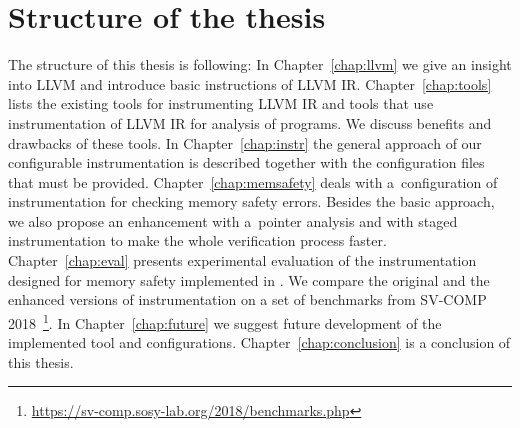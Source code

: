 \section{Structure of the thesis}

The structure of this thesis is following: In Chapter~\ref{chap:llvm} we give
an insight into LLVM and introduce basic instructions of LLVM IR.
Chapter~\ref{chap:tools} lists the existing tools for instrumenting LLVM IR and
tools that use instrumentation of LLVM IR for analysis of programs. We discuss
benefits and drawbacks of these tools. In Chapter~\ref{chap:instr} the general
approach of our configurable instrumentation is described together with the
configuration files that must be provided. Chapter~\ref{chap:memsafety} deals
with a~configuration of instrumentation for checking memory safety errors.
Besides the basic approach, we also propose an enhancement with a~pointer
analysis and with staged instrumentation to make the whole verification process
faster. Chapter~\ref{chap:eval} presents experimental evaluation of the
instrumentation designed for memory safety implemented in \symbiotic. We
compare the original and the enhanced versions of instrumentation on a set of
benchmarks from SV-COMP
2018~\footnote{\url{https://sv-comp.sosy-lab.org/2018/benchmarks.php}}.  In
Chapter~\ref{chap:future} we suggest future development of the implemented tool
and configurations. Chapter~\ref{chap:conclusion} is a conclusion of this
thesis.
